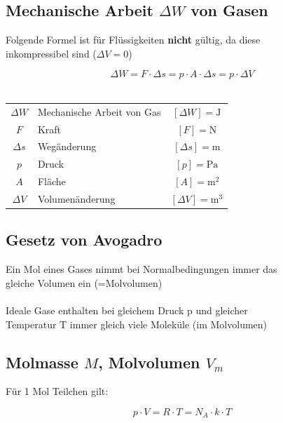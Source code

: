 

\subsection{Mechanische Arbeit $\Delta W$ von Gasen}
\label{MechArbeit}

Folgende Formel ist für Flüssigkeiten \textbf{nicht} gültig, da diese \\
inkompressibel sind ($\Delta V = 0$)


$$ \boxed{ \Delta W = F \cdot \Delta s = p \cdot A \cdot \Delta s = p \cdot \Delta V } $$
\\

\begin{tabular}{c l c}
	$\Delta W$ & Mechanische Arbeit von Gas & $[\Delta W] = \mathrm{J}$ \\
	$F$ & Kraft & $[F] = \mathrm{N}$ \\
	$\Delta s$ & Wegänderung & $[\Delta s] = \mathrm{m}$ \\
	$p$ & Druck & $[p] = \mathrm{Pa}$ \\
	$A$ & Fläche & $[A] = \mathrm{m^2}$ \\
	$\Delta V$ & Volumenänderung & $[\Delta V] = \mathrm{m^3}$ \\
\end{tabular}



\subsection{Gesetz von Avogadro}
Ein Mol eines Gases nimmt bei Normalbedingungen immer das \\
gleiche Volumen ein (=Molvolumen) \\
\\
Ideale Gase enthalten bei gleichem Druck p und gleicher \\
Temperatur T immer gleich viele Moleküle (im Molvolumen)





\subsection{Molmasse $M$, Molvolumen $V_m$}

Für 1 Mol Teilchen gilt: 

$$ \boxed{ p \cdot V = R \cdot T = N_A \cdot k \cdot T } $$
\\

